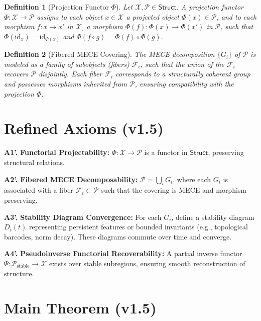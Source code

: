 \documentclass[11pt]{article}
\newtheorem{definition}{Definition}[section]
\begin{document}
\begin{definition}[Projection Functor \( \Phi \)]
Let \( \mathcal{X}, \mathcal{P} \in \mathsf{Struct} \). A projection functor \( \Phi: \mathcal{X} \to \mathcal{P} \) assigns to each object \( x \in \mathcal{X} \) a projected object \( \Phi(x) \in \mathcal{P} \), and to each morphism \( f: x \to x' \) in \( \mathcal{X} \), a morphism \( \Phi(f): \Phi(x) \to \Phi(x') \) in \( \mathcal{P} \), such that \( \Phi(\text{id}_x) = \text{id}_{\Phi(x)} \) and \( \Phi(f \circ g) = \Phi(f) \circ \Phi(g) \).
\end{definition}

\begin{definition}[Fibered MECE Covering]
The MECE decomposition \( \{G_i\} \) of \( \mathcal{P} \) is modeled as a family of subobjects (fibers) \( \mathcal{F}_i \), such that the union of the \( \mathcal{F}_i \) recovers \( \mathcal{P} \) disjointly. Each fiber \( \mathcal{F}_i \) corresponds to a structurally coherent group and possesses morphisms inherited from \( \mathcal{P} \), ensuring compatibility with the projection \( \Phi \).
\end{definition}

\section{Refined Axioms (v1.5)}

\textbf{A1'. Functorial Projectability:} \( \Phi: \mathcal{X} \to \mathcal{P} \) is a functor in \( \mathsf{Struct} \), preserving structural relations.

\textbf{A2'. Fibered MECE Decomposability:} \( \mathcal{P} = \bigcup_i G_i \), where each \( G_i \) is associated with a fiber \( \mathcal{F}_i \subset \mathcal{P} \) such that the covering is MECE and morphism-preserving.

\textbf{A3'. Stability Diagram Convergence:} For each \( G_i \), define a stability diagram \( D_i(t) \) representing persistent features or bounded invariants (e.g., topological barcodes, norm decay). These diagrams commute over time and converge.

\textbf{A4'. Pseudoinverse Functorial Recoverability:} A partial inverse functor \( \Psi: \mathcal{P}_{\text{stable}} \to \mathcal{X} \) exists over stable subregions, ensuring smooth reconstruction of structure.

\section{Main Theorem (v1.5)}
\end{document}
